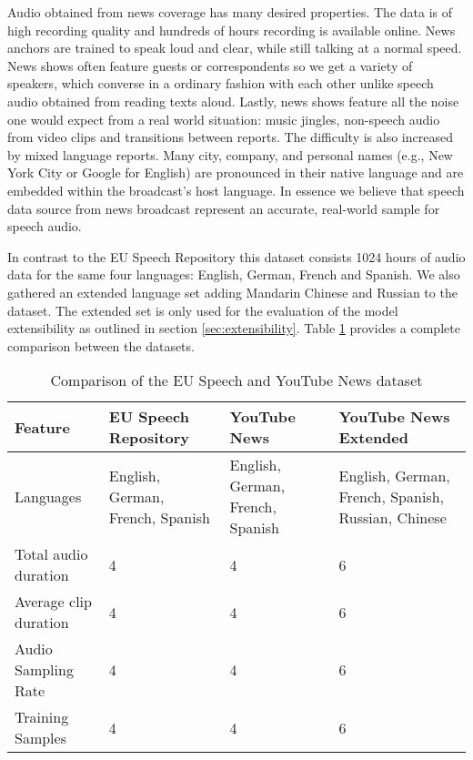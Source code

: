   	
  	Audio obtained from news coverage has many desired properties. The data is of high recording quality and hundreds of hours recording is available online. News anchors are trained to speak loud and clear, while still talking at a normal speed. News shows often feature guests or correspondents so we get a variety of speakers, which converse in a ordinary fashion with each other unlike speech audio obtained from reading texts aloud. Lastly, news shows feature all the noise one would expect from a real world situation: music jingles, non-speech audio from video clips and transitions between reports. The difficulty is also increased by mixed language reports. Many city, company, and personal names (e.g., New York City or Google for English) are pronounced in their native language and are embedded within the broadcast's host language. In essence we believe that speech data source from news broadcast represent an accurate, real-world sample for speech audio.
  	
  	In contrast to the EU Speech Repository this dataset consists 1024 hours of audio data for the same four languages: English, German, French and Spanish. We also gathered an extended language set adding Mandarin Chinese and Russian to the dataset. The extended set is only used for the evaluation of the model extensibility as outlined in section \ref{sec:extensibility}. Table \ref{tab:dataset_comparison} provides a complete comparison between the datasets.
  	
  	
\begin{table}[]
\centering
\begin{tabularx}{\textwidth}{lXXX}
\toprule
Feature               & EU Speech Repository & YouTube News & YouTube News \mbox{Extended} \\ 
\midrule
Languages             & English, German, French, Spanish & English, German, French, Spanish & English, German, French, Spanish, Russian, Chinese \\
Total audio duration  & 4                    & 4            & 6                     \\
Average clip duration & 4                    & 4            & 6                     \\
Audio Sampling Rate   & 4                    & 4            & 6                     \\ 
Training Samples      & 4                    & 4            & 6                     \\ 
\bottomrule
\end{tabularx}
\caption{Comparison of the EU Speech and YouTube News dataset}
\label{tab:dataset_comparison}
\end{table}
	



